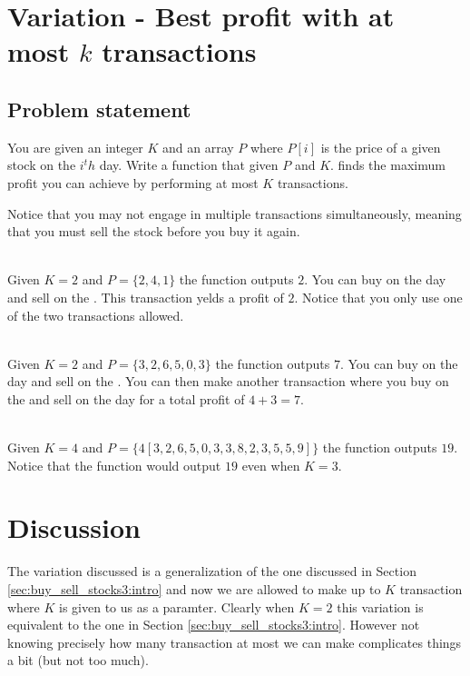 \section{Variation - Best profit with at most $k$ transactions}
\label{sec:buy_sell_stocks4:intro}

\subsection{Problem statement}
\begin{exercise}
	You are given an integer $K$ and an array $P$ where $P[i]$ is the price of a given stock on the $i^th$ day.
	Write a function that given $P$ and $K$. finds the maximum profit you can achieve by performing at most $K$ transactions.
	
	Notice that you may not engage in multiple transactions simultaneously, meaning that you must sell the stock before you buy it again.
		 

	\begin{example}
	\label{ex:buy_sell_stocks4:exmaple1}
		\hfill \\
		Given $K=2$ and $P=\{2,4,1\}$ the function outputs $2$. 
		You can buy on the  day and sell on the . This transaction yelds a profit of $2$. Notice that you only use one of the two transactions allowed.
	\end{example}

	\begin{example}
		\label{ex:buy_sell_stocks4:exmaple2}
			\hfill \\
			Given $K=2$ and $P=\{3,2,6,5,0,3\}$ the function outputs $7$. 
			You can buy on the  day and sell on the . You can then make another transaction where you buy on the  and sell on the  day for a total profit of $4+3=7$.
	\end{example}

	\begin{example}
		\label{ex:buy_sell_stocks4:exmaple3}
			\hfill \\
			Given $K=4$ and $P=\{4
			[3,2,6,5,0,3,3,8,2,3,5,5,9]\}$ the function outputs $19$. 
			Notice that the function would output $19$ even when $K=3$.
	\end{example}
\end{exercise}


\section{Discussion}
\label{buy_sell_stocks4:sec:discussion}
The variation discussed is a generalization of the one discussed in Section \ref{sec:buy_sell_stocks3:intro} and now we are allowed to make up to $K$ transaction where $K$ is given to us as a paramter. Clearly when $K=2$ this variation is equivalent to the one in Section \ref{sec:buy_sell_stocks3:intro}. However not knowing precisely how many transaction at most we can make complicates things a bit (but not too much).

